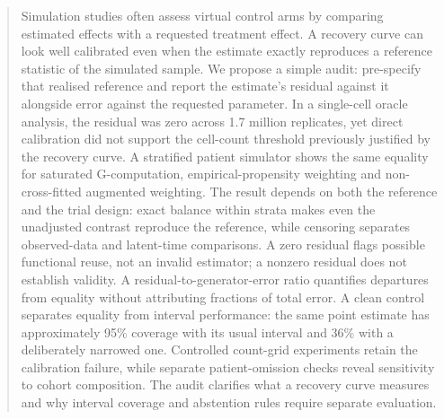 \begin{abstract}
Simulation studies often assess virtual control arms by comparing estimated
effects with a requested treatment effect. A recovery curve can look well
calibrated even when the estimate exactly reproduces a reference statistic of
the simulated sample. We propose a simple audit: pre-specify that realised
reference and report the estimate's residual against it alongside error against
the requested parameter. In a single-cell oracle analysis, the residual was
zero across 1.7 million replicates, yet direct calibration did not support the
cell-count threshold previously justified by the recovery curve. A stratified
patient simulator shows the same equality for saturated G-computation,
empirical-propensity weighting and non-cross-fitted augmented weighting.
The result depends on both the reference and the trial design: exact balance
within strata makes even the unadjusted contrast reproduce the reference,
while censoring separates observed-data and latent-time comparisons.
A zero residual flags possible functional reuse, not an invalid estimator; a
nonzero residual does not establish validity. A residual-to-generator-error
ratio quantifies departures from equality without attributing fractions of
total error. A clean control separates equality from interval performance: the same point
estimate has approximately 95\% coverage with its usual interval and 36\% with
a deliberately narrowed one. Controlled count-grid experiments retain the
calibration failure, while separate patient-omission checks reveal sensitivity
to cohort composition. The audit clarifies what a
recovery curve measures and why interval coverage and abstention rules require
separate evaluation.
\end{abstract}

